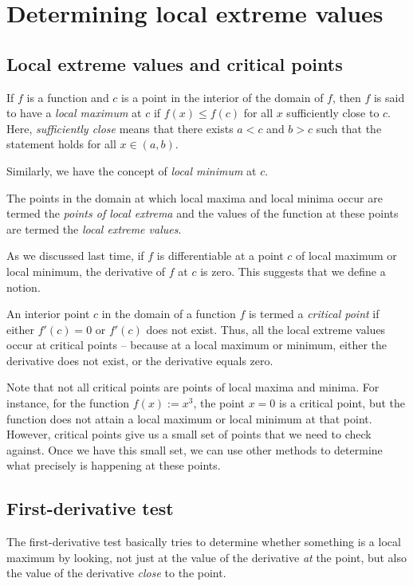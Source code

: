 \documentclass{amsart}
\begin{document}
\section{Determining local extreme values}

\subsection{Local extreme values and critical points}

If $f$ is a function and $c$ is a point in the interior of the domain
of $f$, then $f$ is said to have a {\em local maximum} at $c$ if $f(x)
\le f(c)$ for all $x$ sufficiently close to $c$. Here, {\em
sufficiently close} means that there exists $a < c$ and $b > c$ such
that the statement holds for all $x \in (a,b)$.

Similarly, we have the concept of {\em local minimum} at $c$.

The points in the domain at which local maxima and local minima occur
are termed the {\em points of local extrema} and the values of the
function at these points are termed the {\em local extreme values}.

As we discussed last time, if $f$ is differentiable at a point $c$ of
local maximum or local minimum, the derivative of $f$ at $c$ is
zero. This suggests that we define a notion.

An interior point $c$ in the domain of a function $f$ is termed a {\em
critical point} if either $f'(c) = 0$ or $f'(c)$ does not exist. Thus,
all the local extreme values occur at critical points -- because at a
local maximum or minimum, either the derivative does not exist, or the
derivative equals zero.

Note that not all critical points are points of local maxima and
minima. For instance, for the function $f(x) := x^3$, the point $x =
0$ is a critical point, but the function does not attain a local
maximum or local minimum at that point. However, critical points give
us a small set of points that we need to check against. Once we have
this small set, we can use other methods to determine what precisely
is happening at these points.

\subsection{First-derivative test}

The first-derivative test basically tries to determine whether
something is a local maximum by looking, not just at the value of the
derivative {\em at} the point, but also the value of the derivative
{\em close} to the point.
\end{document}
